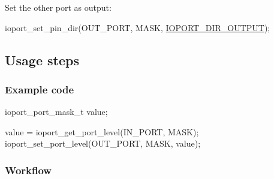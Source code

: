 \begin{DoxyEnumerate}
\begin{DoxyItemize}
\end{DoxyItemize}
\item Set the other port as output\-:
\begin{DoxyItemize}
\item 
\begin{DoxyCode}
 ioport\_set\_pin\_dir(OUT\_PORT, MASK, \hyperlink{group__ioport__group_gga9c267f89800e58bd9dfd74e662a4a4c1a06de24313dad0169f3a366c62a84f4cc}{IOPORT\_DIR\_OUTPUT}); 
\end{DoxyCode}

\end{DoxyItemize}
\end{DoxyEnumerate}\hypertarget{ioport_quickstart_use_case_1_ioport_quickstart_basic_usage}{}\subsection{Usage steps}\label{ioport_quickstart_use_case_1_ioport_quickstart_basic_usage}
\hypertarget{ioport_quickstart_use_case_1_ioport_quickstart_basic_usage_code}{}\subsubsection{Example code}\label{ioport_quickstart_use_case_1_ioport_quickstart_basic_usage_code}

\begin{DoxyCode}
         ioport\_port\_mask\_t value;

         value = ioport\_get\_port\_level(IN\_PORT, MASK);
         ioport\_set\_port\_level(OUT\_PORT, MASK, value);
\end{DoxyCode}
\hypertarget{ioport_quickstart_use_case_1_ioport_quickstart_basic_usage_flow}{}\subsubsection{Workflow}\label{ioport_quickstart_use_case_1_ioport_quickstart_basic_usage_flow}

